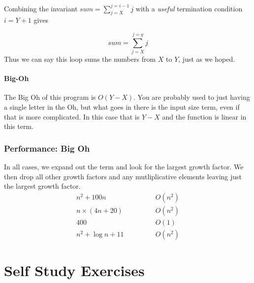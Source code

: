 \documentclass[twoside=false,DIV=14]{scrartcl}
\begin{document}
Combining the invariant $sum = \sum_{j = X}^{j = i -1}j$ with a \emph{useful} termination condition $i = Y + 1$ gives 

$$
sum = \sum_{j = X}^{j = y}j
$$
Thus we can say this loop sums the numbers from $X$ to $Y$, just as we hoped.

\subsection{Big-Oh}
The Big Oh of this program is $O(Y-X)$.  You are probably used to just having a single letter in the Oh, but what goes in there is the input size term, even if that is more complicated.  In this case that is $Y-X$ and the function is linear in this term.

\section{Performance: Big Oh}
In all cases, we expand out the term and look for the largest growth factor.  We then drop all other growth factors and any mutliplicative elements leaving just the largest growth factor.
\begin{align*}
n^2 + 100n  & \hspace{3em} & O(n^2) \\
n\times (4n + 20) & &  O(n^2) \\
400 & & O(1) \\
n^2 + \log n + 11  & & O(n^2)
\end{align*}

\newpage\setcounter{section}{0}
\part*{Self Study Exercises}
\end{document}
